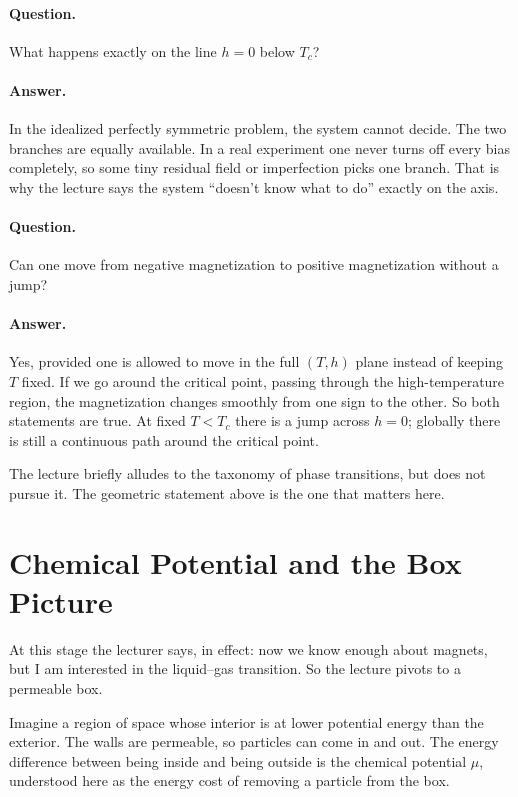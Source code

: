 \paragraph{Question.} What happens exactly on the line \(h=0\) below \(T_c\)?

\paragraph{Answer.} In the idealized perfectly symmetric problem, the system cannot decide. The two branches are equally available. In a real experiment one never turns off every bias completely, so some tiny residual field or imperfection picks one branch. That is why the lecture says the system ``doesn't know what to do'' exactly on the axis.

\paragraph{Question.} Can one move from negative magnetization to positive magnetization without a jump?

\paragraph{Answer.} Yes, provided one is allowed to move in the full \((T,h)\) plane instead of keeping \(T\) fixed. If we go around the critical point, passing through the high-temperature region, the magnetization changes smoothly from one sign to the other. So both statements are true. At fixed \(T<T_c\) there is a jump across \(h=0\); globally there is still a continuous path around the critical point.

The lecture briefly alludes to the taxonomy of phase transitions, but does not pursue it. The geometric statement above is the one that matters here.

\section{Chemical Potential and the Box Picture}

At this stage the lecturer says, in effect: now we know enough about magnets, but I am interested in the liquid--gas transition. So the lecture pivots to a permeable box.

Imagine a region of space whose interior is at lower potential energy than the exterior. The walls are permeable, so particles can come in and out. The energy difference between being inside and being outside is the chemical potential \(\mu\), understood here as the energy cost of removing a particle from the box.

